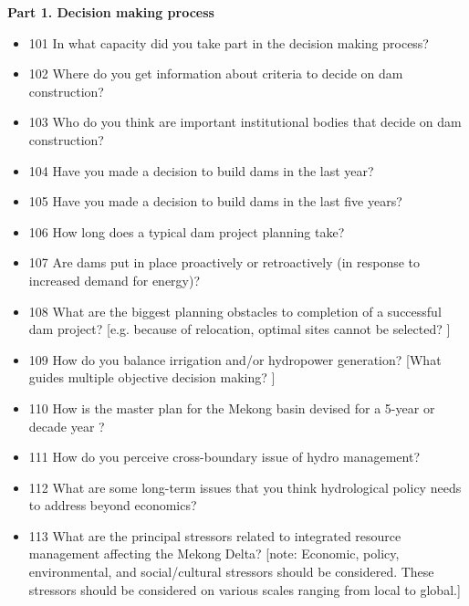 \documentclass[11pt,english]{article}
\theoremstyle{plain} \newtheorem{claim}{Claim}
\theoremstyle{plain} \newtheorem{prop}{Proposition}
\theoremstyle{plain} \newtheorem{hypo}{Hypothesis}
\begin{document}
\textbf{Part 1. Decision making process}

\begin{itemize}
\item[] 101 In what capacity did you take part in the decision making process? 

\item[] 102 Where do you get information about criteria to decide on dam construction? 
 
\item[] 103 Who do you think are important institutional bodies that decide on dam construction? 

\item[] 104 Have you made a decision to build dams in the last year? 

\item[] 105 Have you made a decision to build dams in the last five years?

\item[] 106 How long does a typical dam project planning take? 

\item[] 107 Are dams put in place proactively or retroactively (in response to increased demand for energy)?

\item[] 108 What are the biggest planning obstacles to completion of a successful dam project? [e.g. because of relocation, optimal sites cannot be selected? ]

\item[] 109 How do you balance irrigation and/or hydropower generation? 
[What guides multiple objective decision making?  ]

\item[] 110 How is the master plan for the Mekong basin devised for a 5-year or decade year ?

\item[] 111 How do you perceive cross-boundary issue of hydro management? 

\item[] 112 What are some long-term issues that you think hydrological policy needs to address beyond economics? 

\item[] 113 What are the principal stressors related to integrated resource management affecting the Mekong Delta? [note: Economic, policy, environmental, and social/cultural stressors should be considered. These stressors should be considered on various scales ranging from local to global.]

\end{itemize}
\end{document}
